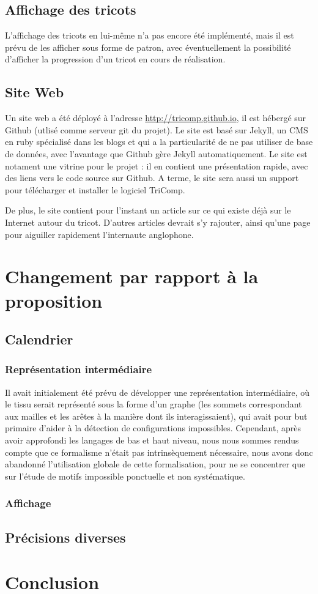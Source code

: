 \documentclass{article}
\begin{document}
\subsection{Affichage des tricots}

L'affichage des tricots en lui-même n'a pas encore été implémenté, mais il est prévu de les afficher sous forme de patron, avec éventuellement la 
possibilité d'afficher la progression d'un tricot en cours de réalisation. 

\subsection{Site Web}

Un site web a été déployé à l'adresse \url{http://tricomp.github.io}, il est hébergé sur Github (utlisé comme serveur git du projet). Le site est basé sur Jekyll, un CMS en ruby spécialisé dans les blogs et qui a la particularité de ne pas utiliser de base de données, avec l'avantage que Github gère Jekyll automatiquement. Le site est notament une vitrine pour le projet : il en contient une présentation rapide, avec des liens vers le code source sur Github. A terme, le site sera aussi un support pour télécharger et installer le logiciel TriComp.

De plus, le site contient pour l'instant un article sur ce qui existe déjà sur le Internet autour du tricot. D'autres articles devrait s'y rajouter, ainsi qu'une page pour aiguiller rapidement l'internaute anglophone.

\section{Changement par rapport à la proposition}

\subsection{Calendrier}

\subsubsection{Représentation intermédiaire}

Il avait initialement été prévu de développer une représentation intermédiaire, où le tissu serait représenté sous la forme d'un graphe (les sommets 
correspondant aux mailles et les arêtes à la manière dont ils interagissaient), qui avait pour but primaire d'aider à la détection de configurations 
impossibles. Cependant, après avoir approfondi les langages de bas et haut niveau, nous nous sommes rendus compte que ce formalisme n'était pas 
intrinsèquement nécessaire, nous avons donc abandonné l'utilisation globale de cette formalisation, pour ne se concentrer que sur l'étude de motifs 
impossible ponctuelle et non systématique.

\subsubsection{Affichage}



\subsection{Précisions diverses}

\section*{Conclusion}
\end{document}
